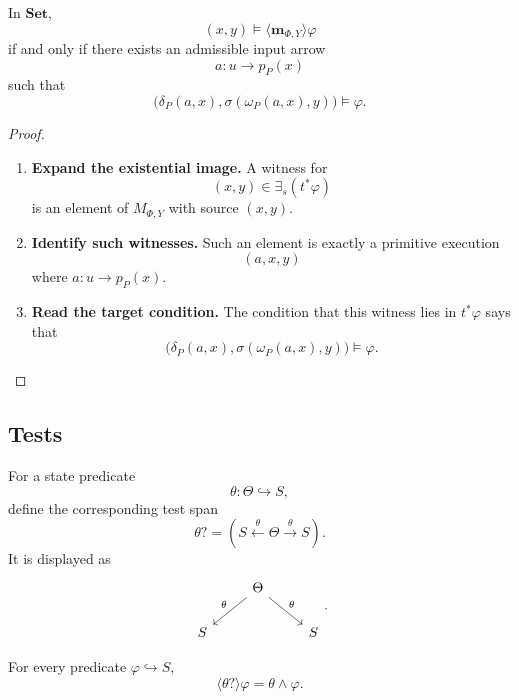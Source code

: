 \begin{proposition}
\label{prop:relative-primitive-diamond-set-reading}
In \(\mathbf{Set}\),
\[
(x,y)\models \langle \mathbf m_{\Phi,Y}\rangle\varphi
\]
if and only if there exists an admissible input arrow
\[
a:u\to p_P(x)
\]
such that
\[
\bigl(
\delta_P(a,x),
\sigma(\omega_P(a,x),y)
\bigr)
\models \varphi.
\]
\end{proposition}

\begin{proof}
\leavevmode
\begin{enumerate}
\item \textbf{Expand the existential image.}
A witness for
\[
(x,y)\in\exists_s(t^\ast\varphi)
\]
is an element of \(M_{\Phi,Y}\) with source \((x,y)\).

\item \textbf{Identify such witnesses.}
Such an element is exactly a primitive execution
\[
(a,x,y)
\]
where \(a:u\to p_P(x)\).

\item \textbf{Read the target condition.}
The condition that this witness lies in \(t^\ast\varphi\) says that
\[
\bigl(
\delta_P(a,x),
\sigma(\omega_P(a,x),y)
\bigr)
\models\varphi.
\]
\end{enumerate}
\end{proof}

\subsection{Tests}
\label{subsec:relative-tests}

\begin{definition}[Tests]
\label{def:relative-tests}
For a state predicate
\[
\theta:\Theta\hookrightarrow S,
\]
define the corresponding test span
\[
\theta?
=
(S\xleftarrow{\theta}\Theta\xrightarrow{\theta}S).
\]
It is displayed as
\[
\begin{tikzcd}
& \Theta \arrow[dl,"\theta"'] \arrow[dr,"\theta"] & \\
S && S
\end{tikzcd}
.
\]
\end{definition}

\begin{proposition}
\label{prop:relative-test-diamond}
For every predicate \(\varphi\hookrightarrow S\),
\[
\langle\theta?\rangle\varphi
=
\theta\wedge\varphi.
\]
\end{proposition}

